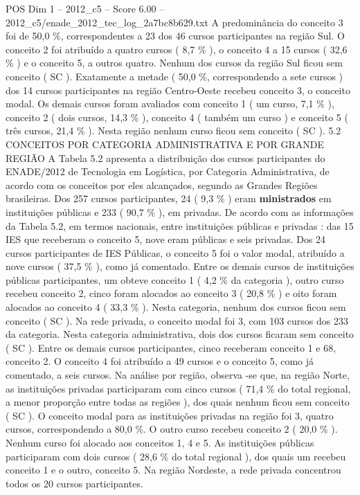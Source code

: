 \begin{textsample}{POS Dim 1 – 2012\_c5 – Score 6.00 – 2012\_c5/enade\_2012\_tec\_log\_2a7bc8b629.txt}
A predominância do conceito 3 foi de 50,0 \%, correspondentes a 23 dos 46 cursos participantes na região Sul.
O conceito 2 foi atribuído a quatro cursos ( 8,7 \% ), o conceito 4 a 15 cursos ( 32,6 \% ) e o conceito 5, a outros quatro.
Nenhum dos cursos da região Sul ficou sem conceito ( SC ).
Exatamente a metade ( 50,0 \%, correspondendo a sete cursos ) dos 14 cursos participantes na região Centro-Oeste recebeu conceito 3, o conceito modal.
Os demais cursos foram avaliados com conceito 1 ( um curso, 7,1 \% ), conceito 2 ( dois cursos, 14,3 \% ), conceito 4 ( também um curso ) e conceito 5 ( três cursos, 21,4 \% ).
Nesta região nenhum curso ficou sem conceito ( SC ). 5.2 CONCEITOS POR CATEGORIA ADMINISTRATIVA E POR GRANDE REGIÃO A Tabela 5.2 apresenta a distribuição dos cursos participantes do ENADE/2012 de Tecnologia em Logística, por Categoria Administrativa, de acordo com os conceitos por eles alcançados, segundo as Grandes Regiões brasileiras.
Dos 257 cursos participantes, 24 ( 9,3 \% ) eram \textbf{ministrados} em instituições públicas e 233 ( 90,7 \% ), em privadas.
De acordo com as informações da Tabela 5.2, em termos nacionais, entre instituições públicas e privadas : das 15 IES que receberam o conceito 5, nove eram públicas e seis privadas.
Dos 24 cursos participantes de IES Públicas, o conceito 5 foi o valor modal, atribuído a nove cursos ( 37,5 \% ), como já comentado.
Entre os demais cursos de instituições públicas participantes, um obteve conceito 1 ( 4,2 \% da categoria ), outro curso recebeu conceito 2, cinco foram alocados ao conceito 3 ( 20,8 \% ) e oito foram alocados ao conceito 4 ( 33,3 \% ).
Nesta categoria, nenhum dos cursos ficou sem conceito ( SC ).
Na rede privada, o conceito modal foi 3, com 103 cursos dos 233 da categoria.
Nesta categoria administrativa, dois dos cursos ficaram sem conceito ( SC ).
Entre os demais cursos participantes, cinco receberam conceito 1 e 68, conceito 2.
O conceito 4 foi atribuído a 49 cursos e o conceito 5, como já comentado, a seis cursos.
Na análise por região, observa -se que, na região Norte, as instituições privadas participaram com cinco cursos ( 71,4 \% do total regional, a menor proporção entre todas as regiões ), dos quais nenhum ficou sem conceito ( SC ).
O conceito modal para as instituições privadas na região foi 3, quatro cursos, correspondendo a 80,0 \%.
O outro curso recebeu conceito 2 ( 20,0 \% ).
Nenhum curso foi alocado aos conceitos 1, 4 e 5.
As instituições públicas participaram com dois cursos ( 28,6 \% do total regional ), dos quais um recebeu conceito 1 e o outro, conceito 5.
Na região Nordeste, a rede privada concentrou todos os 20 cursos participantes.

\end{textsample}
